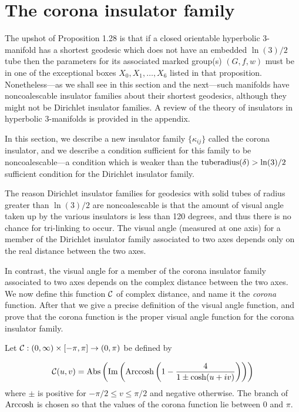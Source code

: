  
\def\Relength{{\rm Relength}}
\def\length{{\rm length}}
\def\Arccosh{{\rm Arccosh}}
\def\trace{{\rm trace}}
\def\distance{{\rm distance}}
\def\Redistance{{\rm Redistance}}
\def\va{{\rm visualangle}}

\vglue-12pt
\section{The corona insulator family}
\vglue-4pt
 
The upshot of Proposition 1.28 is that if a closed orientable hyperbolic
3-manifold has a shortest geodesic which does not have an embedded
$\ln(3)/2$ tube then the parameters for its associated marked group(s)
$(G,f,w)$  must be in one of the exceptional boxes 
$X_0, X_1, \ldots, X_6$ listed in that proposition.
Nonetheless---as we shall see in this section and the next---such manifolds
have noncoalescable insulator families about their shortest geodesics,
although they might not be Dirichlet insulator families.  A review of the
theory of insulators in hyperbolic 3-manifolds is provided in the
appendix.

In this section, we describe a new insulator  family $\{\kappa_{ij}\}$
called the corona insulator, and
we describe a condition sufficient for this family to be
non\-coalescable---a condition which is weaker than the
${\rm tuberadius}(\delta) > \ln(3)/2$ sufficient condition for the
Dirichlet insulator family.

The reason Dirichlet insulator families for geodesics with solid tubes of
radius greater than $\ln(3)/2$ are noncoalescable is that the amount of
visual angle taken up by the various insulators is less than 120 degrees,
and thus there is no chance for tri-linking to occur.   The visual angle
(measured at one axis) for a member of the Dirichlet insulator family
associated to two axes depends only on the real distance between the two
axes.

In contrast, the visual angle for a member of the corona insulator family
associated to two axes depends on the complex distance between the two
axes.  We now define this function ${\cal C}$ of complex distance,
and name it the {\it corona} function.  After that we give a precise
definition of the visual angle function, and prove that the corona function
is the proper visual angle function for the corona insulator family.

 Let
${\cal C}: (0,\infty)\times [-\pi,\pi]\to (0,\pi)$ be defined by

$${\cal C}(u,v) = {\rm Abs}\left({\rm Im}
\left(\Arccosh\left(1-{4 \over 1 \pm \cosh(u+iv)} \right)\right)\right)$$
\noindent where $\pm$ is positive for $-\pi/2 \le v \le \pi/2$ and negative
otherwise.  The branch of $\Arccosh$ is chosen so that the values of the
corona function lie between $0$ and $\pi.$\enddemo

